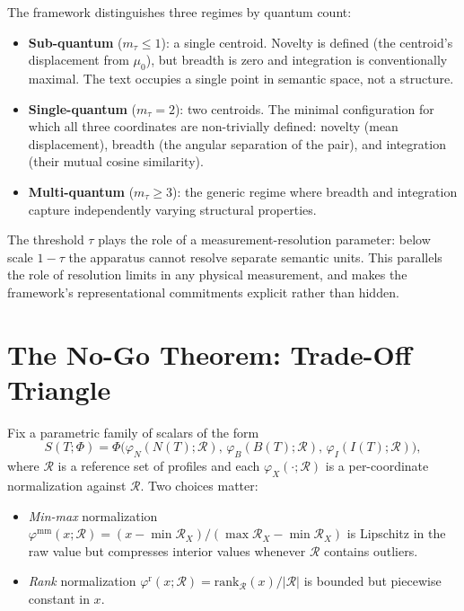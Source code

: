 \documentclass[11pt]{article}
\begin{document}
The framework distinguishes three regimes by quantum count:

\begin{itemize}
\item \textbf{Sub-quantum} ($m_\tau \leq 1$): a single centroid. Novelty is defined (the centroid's displacement from $\mu_0$), but breadth is zero and integration is conventionally maximal. The text occupies a single point in semantic space, not a structure.
\item \textbf{Single-quantum} ($m_\tau = 2$): two centroids. The minimal configuration for which all three coordinates are non-trivially defined: novelty (mean displacement), breadth (the angular separation of the pair), and integration (their mutual cosine similarity).
\item \textbf{Multi-quantum} ($m_\tau \geq 3$): the generic regime where breadth and integration capture independently varying structural properties.
\end{itemize}

The threshold $\tau$ plays the role of a measurement-resolution parameter: below scale $1 - \tau$ the apparatus cannot resolve separate semantic units. This parallels the role of resolution limits in any physical measurement, and makes the framework's representational commitments explicit rather than hidden.

\section{The No-Go Theorem: Trade-Off Triangle}\label{sec:nogo}

Fix a parametric family of scalars of the form
\[
S(T; \Phi) = \Phi\!\big(\varphi_N(N(T); \mathcal{R}), \, \varphi_B(B(T); \mathcal{R}), \, \varphi_I(I(T); \mathcal{R})\big),
\]
where $\mathcal{R}$ is a reference set of profiles and each $\varphi_X(\cdot; \mathcal{R})$ is a per-coordinate normalization against $\mathcal{R}$. Two choices matter:
\begin{itemize}
\item \emph{Min-max} normalization $\varphi^{\mathrm{mm}}(x; \mathcal{R}) = (x - \min \mathcal{R}_X) / (\max \mathcal{R}_X - \min \mathcal{R}_X)$ is Lipschitz in the raw value but compresses interior values whenever $\mathcal{R}$ contains outliers.
\item \emph{Rank} normalization $\varphi^{\mathrm{r}}(x; \mathcal{R}) = \mathrm{rank}_{\mathcal{R}}(x) / |\mathcal{R}|$ is bounded but piecewise constant in $x$.
\end{itemize}
\end{document}

